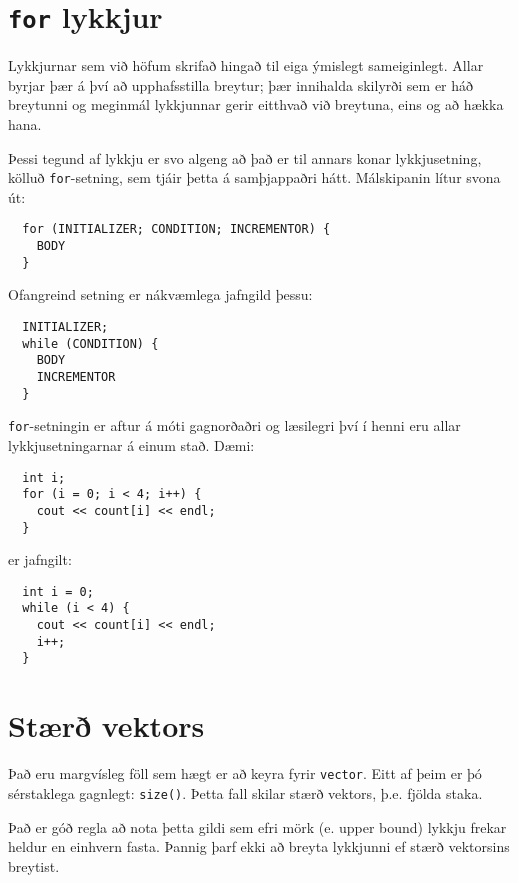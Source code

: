 \section{{\tt for} lykkjur}

Lykkjurnar sem við höfum skrifað hingað til eiga ýmislegt sameiginlegt.
Allar byrjar þær á því að upphafsstilla breytur; þær innihalda skilyrði sem er háð breytunni og meginmál lykkjunnar gerir eitthvað við breytuna, eins og að hækka hana. 


Þessi tegund af lykkju er svo algeng að það er til annars konar lykkjusetning, kölluð {\tt for}-setning, sem tjáir þetta á samþjappaðri hátt.
Málskipanin lítur svona út:

\begin{verbatim}
  for (INITIALIZER; CONDITION; INCREMENTOR) {
    BODY
  }
\end{verbatim}
%
Ofangreind setning er nákvæmlega jafngild þessu:

\begin{verbatim}
  INITIALIZER;
  while (CONDITION) {
    BODY
    INCREMENTOR
  }
\end{verbatim}
%
{\tt for}-setningin er aftur á móti gagnorðaðri og læsilegri því í henni eru allar lykkjusetningarnar á einum stað.
Dæmi:

\begin{verbatim}
  int i;
  for (i = 0; i < 4; i++) {
    cout << count[i] << endl;
  }
\end{verbatim}
%
er jafngilt:

\begin{verbatim}
  int i = 0;
  while (i < 4) {
    cout << count[i] << endl;
    i++;
  }
\end{verbatim}

\section{Stærð vektors}

Það eru margvísleg föll sem hægt er að keyra fyrir {\tt vector}.
Eitt af þeim er þó sérstaklega gagnlegt: {\tt size()}.
Þetta fall skilar stærð vektors, þ.e. fjölda staka.

Það er góð regla að nota þetta gildi sem efri mörk (e. upper bound) lykkju frekar heldur en einhvern fasta.
Þannig þarf ekki að breyta lykkjunni ef stærð vektorsins breytist.

